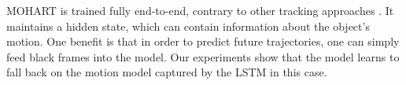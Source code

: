 \Gls{MOHART} is trained fully end-to-end, contrary to other tracking approaches \cite{Zhang2008,Milan2014,Bae2017confidence,Keuper2018motion}.
It maintains a hidden state, which can contain information about the object's motion. One benefit is that in order to predict future trajectories, one can simply feed black frames into the model. Our experiments show that the model learns to fall back on the motion model captured by the \gls{LSTM} in this case. 


